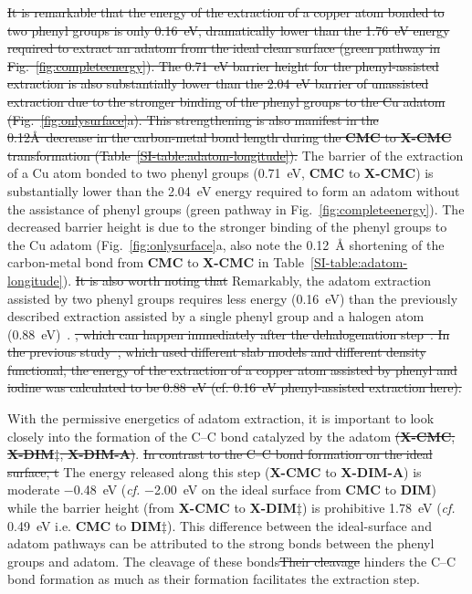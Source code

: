 \documentclass[aps,prb,amsmath,amssymb,11pt]{revtex4-1}
\newcommand{\zhzh}{\color{blue}}
\begin{document}
\sout{It is remarkable that the energy of the extraction of a copper atom bonded to two phenyl groups is only 0.16~eV, dramatically lower than the 1.76~eV energy required to extract an adatom from the ideal clean surface (green pathway in Fig.~\ref{fig:completeenergy}). The 0.71~eV barrier height for the phenyl-assisted extraction is also substantially lower than the 2.04~eV barrier of unassisted extraction due to the stronger binding of the phenyl groups to the Cu adatom (Fig.~\ref{fig:onlysurface}a). This strengthening is also manifest in the 0.12\AA\ decrease in the carbon-metal bond length during the \textbf{CMC} to \textbf{X-CMC} transformation (Table~\ref{SI-table:adatom-longitude}).}
%
{\zhzh The barrier of the extraction of a Cu atom bonded to two phenyl groups (\SI{0.71}{\electronvolt}, \textbf{CMC} to \textbf{X-CMC}) is substantially lower than the \SI{2.04}{\electronvolt} energy required to form an adatom without the assistance of phenyl groups (green pathway in Fig.~\ref{fig:completeenergy}). The decreased barrier height is due to the stronger binding of the phenyl groups to the Cu adatom (Fig.~\ref{fig:onlysurface}a, also note the \SI{0.12}{\angstrom} shortening of the carbon-metal bond from \textbf{CMC} to \textbf{X-CMC} in Table~\ref{SI-table:adatom-longitude}).} 
%
\sout{It is also worth noting that} {\zhzh Remarkably,} the adatom extraction assisted by two phenyl groups requires less energy {\zhzh (\SI{0.16}{\electronvolt})} than the previously described extraction assisted by a single phenyl group and a halogen atom {\zhzh (\SI{0.88}{\electronvolt})}~\cite{chemeurope2017}. \sout{, which can happen immediately after the dehalogenation step~\cite{chemeurope2017}. In the previous study~\cite{chemeurope2017}, which used different slab models and different density functional, the energy of the extraction of a copper atom assisted by phenyl and iodine was calculated to be 0.88~eV (cf. 0.16~eV phenyl-assisted extraction here).}

With the permissive energetics of adatom extraction, it is important to look closely into the formation of the C--C bond catalyzed by the adatom\sout{ (\textbf{X-CMC}, \textbf{X-DIM$\ddagger$}, \textbf{X-DIM-A})}.
\sout{In contrast to the C--C bond formation on the ideal surface, t} {\zhzh T}he energy released along this step {\zhzh (\textbf{X-CMC} to \textbf{X-DIM-A})} is moderate \SI{-0.48}{\electronvolt} (\textit{cf.} \SI{-2.00}{\electronvolt} on the ideal surface {\zhzh from \textbf{CMC} to \textbf{DIM}}) while the barrier height {\zhzh (from \textbf{X-CMC} to \textbf{X-DIM$\ddagger$})} is prohibitive \SI{1.78}{\electronvolt} (\textit{cf.} \SI{0.49}{\electronvolt} {\zhzh i.e. \textbf{CMC} to \textbf{DIM$\ddagger$}}). 
This difference between the ideal-surface and adatom pathways can be attributed to the strong bonds between the phenyl groups and adatom.
{\zhzh The cleavage of these bonds}\sout{Their cleavage} hinders the C--C bond formation as much as their formation facilitates the extraction step.
\end{document}
